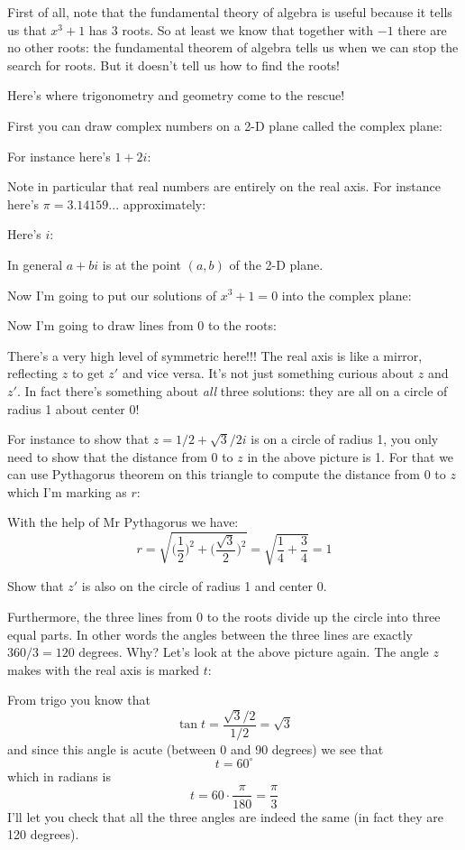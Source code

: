 First of all, note that the fundamental theory of algebra is useful
because it tells us that $x^3 + 1$ has 3 roots.
So at least we know that together with $-1$ there are no other roots:
the fundamental theorem of algebra tells us when we can stop the search for
roots.
But it doesn't tell us how to find the roots!

Here's where trigonometry and geometry come to the rescue!

First you can draw complex numbers on a 2-D plane called the complex
plane:

For instance here's $1 + 2i$:

Note in particular that real numbers are entirely on the real axis.
For instance here's $\pi = 3.14159...$ approximately:

Here's $i$:

In general $a + bi$ is at the point $(a,b)$ of the 2-D plane.


Now I'm going to put our solutions of $x^3 + 1 = 0$ into the complex
plane:


Now I'm going to draw lines from 0 to the roots:

There's a very high level of symmetric here!!!
The real axis is like a mirror, reflecting $z$ to get $z'$ 
and vice versa.
It's not just something curious about $z$ and $z'$.
In fact there's something about \textit{all} three solutions:
they are all on a circle of radius 1 about center 0!

For instance to show that $z = 1/2 + \sqrt{3}/2 i$ is on a circle
of radius 1, you only need to show that the distance from 0 to $z$
in the above picture is 1.
For that we can use Pythagorus theorem on this triangle
to compute the distance from 0 to $z$ which I'm marking as $r$:

With the help of Mr Pythagorus we have:
\[
r = \sqrt{\biggl( \frac{1}{2} \biggr)^2 + \biggl( \frac{\sqrt{3}}{2} \biggr)^2}
= \sqrt{\frac{1}{4} + \frac{3}{4}} = 1
\]


\begin{ex}
Show that $z'$ is also on the circle of radius 1 and center 0.
\end{ex}


Furthermore, the three lines from 0 to the roots divide up the
circle into three equal parts.
In other words the angles between the three lines are exactly 
$360/3 = 120$ degrees.
Why?
Let's look at the above picture again.
The angle  $z$ makes with the real axis is marked $t$:

From trigo you know that
\[
\tan t = \frac{\sqrt{3}/2}{1/2} = \sqrt{3}
\]
and since this angle is acute (between 0 and 90 degrees)
we see that
\[
t = 60^\circ
\]
which in radians is
\[
t = 60 \cdot \frac{\pi}{180} = \frac{\pi}{3}
\]
I'll let you check that all the three angles are  indeed the same
(in fact they are 120 degrees).


